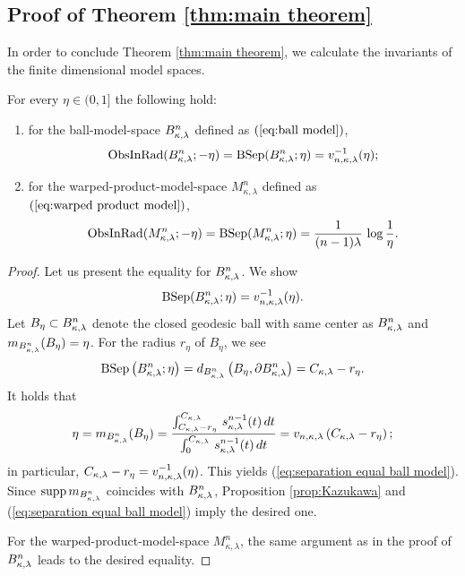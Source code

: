 \subsection{Proof of Theorem \ref{thm:main theorem}}

In order to conclude Theorem \ref{thm:main theorem},
we calculate the invariants of the finite dimensional model spaces.
\begin{lem}\label{lem:observable and separation on model}
For every $\eta \in (0,1]$
the following hold:
\begin{enumerate}
\item for the ball-model-space $B^{n}_{\kappa,\lambda}$ defined as $(\ref{eq:ball model})$,
         \begin{equation*}
         \operatorname{ObsInRad}(B^{n}_{\kappa,\lambda};-\eta)=\operatorname{BSep}(B^{n}_{\kappa,\lambda};\eta)=v^{-1}_{n,\kappa,\lambda}(\eta);
         \end{equation*}
\item for the warped-product-model-space $M^{n}_{\kappa,\lambda}$ defined as $(\ref{eq:warped product model})$,
         \begin{equation*}
         \operatorname{ObsInRad}(M^{n}_{\kappa,\lambda};-\eta)=\operatorname{BSep}(M^{n}_{\kappa,\lambda};\eta)=\frac{1}{(n-1)\lambda}\,\log \frac{1}{\eta}.
         \end{equation*}
\end{enumerate}
\end{lem}
\begin{proof}
Let us present the equality for $B^{n}_{\kappa,\lambda}$.
We show
\begin{equation}\label{eq:separation equal ball model}
\operatorname{BSep}(B^{n}_{\kappa,\lambda};\eta)=v^{-1}_{n,\kappa,\lambda}(\eta).
\end{equation}
Let $B_{\eta} \subset B^{n}_{\kappa,\lambda}$ denote the closed geodesic ball with same center as $B^{n}_{\kappa,\lambda}$ and $m_{B^{n}_{\kappa,\lambda}}(B_{\eta})=\eta$.
For the radius $r_{\eta}$ of $B_{\eta}$,
we see
\begin{equation*}
\operatorname{BSep} \left(B^{n}_{\kappa,\lambda};\eta \right)=d_{B^{n}_{\kappa,\lambda}}\left(B_{\eta},\partial B^{n}_{\kappa,\lambda} \right)=C_{\kappa,\lambda}-r_{\eta}.
\end{equation*}
It holds that
\begin{equation*}
\eta=m_{B^{n}_{\kappa,\lambda}}(B_{\eta})=\frac{\int^{C_{\kappa,\lambda}}_{C_{\kappa,\lambda}-r_{\eta}}\,s^{n-1}_{\kappa,\lambda}(t)\,dt}{\int^{C_{\kappa,\lambda}}_{0}\,s^{n-1}_{\kappa,\lambda}(t)\,dt}=v_{n,\kappa,\lambda}\left(C_{\kappa,\lambda}-r_{\eta}\right);
\end{equation*}
in particular,
$C_{\kappa,\lambda}-r_{\eta}=v^{-1}_{n,\kappa,\lambda}(\eta)$.
This yields (\ref{eq:separation equal ball model}).
Since $\mathrm{supp}\, m_{B^{n}_{\kappa,\lambda}}$ coincides with $B^{n}_{\kappa,\lambda}$,
Proposition \ref{prop:Kazukawa} and (\ref{eq:separation equal ball model}) imply the desired one.

For the warped-product-model-space $M^{n}_{\kappa,\lambda}$,
the same argument as in the proof of $B^{n}_{\kappa,\lambda}$ leads to the desired equality.
\end{proof}

